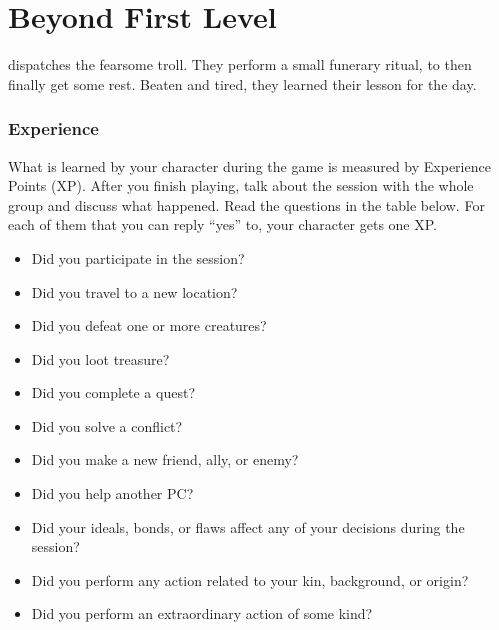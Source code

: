 \section{Beyond First Level} \label{ssec::beyondfirstlevel}
dispatches the fearsome troll.
They perform a small funerary ritual, to then finally get some rest.
Beaten and tired, they learned their lesson for the day.


\thispagestyle{empty}

\subsubsection{Experience}
    What is learned by your character during the game is measured by Experience Points (XP).
    After you finish playing, talk about the session with the whole group and discuss what happened.
    Read the questions in the table below.
    For each of them that you can reply ``yes'' to, your character gets one XP.

    \begin{itemize}
        \item Did you participate in the session?
        \item Did you travel to a new location?
        \item Did you defeat one or more creatures?
        \item Did you loot treasure?
        \item Did you complete a quest?
        \item Did you solve a conflict?
        \item Did you make a new friend, ally, or enemy?
        \item Did you help another PC?
        \item Did your ideals, bonds, or flaws affect any of your decisions during the session?
        \item Did you perform any action related to your kin, background, or origin?
        \item Did you perform an extraordinary action of some kind?
    \end{itemize}


